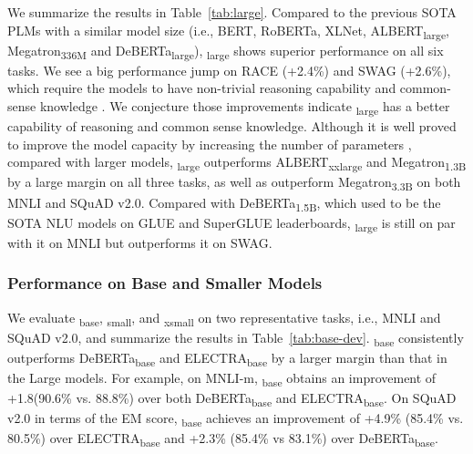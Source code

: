 We summarize the results in Table~{\ref{tab:large}}. 
Compared to the previous SOTA PLMs with a similar model size (i.e., BERT, RoBERTa, XLNet,  ALBERT\textsubscript{large}, Megatron\textsubscript{336M} and DeBERTa\textsubscript{large}),  {\ModelName}\textsubscript{large} shows superior performance on all six tasks. We see a big performance jump on RACE (+2.4\%) and SWAG (+2.6\%), which require the models to have non-trivial reasoning capability and common-sense knowledge \citep{lai2017race, zellers2018swag}. We conjecture those improvements indicate {\ModelName}\textsubscript{large} has a better capability of reasoning and common sense knowledge. Although it is well proved to improve the model capacity by increasing the number of parameters \citep{raffel2019t5,fedus2021switch}, compared with larger models, {\ModelName}\textsubscript{large} outperforms ALBERT\textsubscript{xxlarge} and Megatron\textsubscript{1.3B} by a large margin on all three tasks, as well as outperform Megatron\textsubscript{3.3B} on both MNLI and SQuAD v2.0. Compared with DeBERTa\textsubscript{1.5B}, which used to be the SOTA NLU models on GLUE and SuperGLUE leaderboards, {\ModelName}\textsubscript{large} is still on par with it on MNLI but outperforms it on SWAG. 

\subsubsection{Performance on Base and Smaller Models}

We evaluate {\ModelName}\textsubscript{base}, {\ModelName}\textsubscript{small}, and {\ModelName}\textsubscript{xsmall} on two representative tasks, i.e., MNLI and SQuAD v2.0, and summarize the results in Table~\ref{tab:base-dev}. 
{\ModelName}\textsubscript{base} consistently outperforms DeBERTa\textsubscript{base} and ELECTRA\textsubscript{base} by a larger margin than that in the Large models. For example, on MNLI-m, {\ModelName\textsubscript{base}} obtains an improvement of +1.8(90.6\% vs. 88.8\%) over both DeBERTa\textsubscript{base} and ELECTRA\textsubscript{base}. On SQuAD v2.0 in terms of the EM score,  {\ModelName\textsubscript{base}} achieves an improvement of +4.9\%  (85.4\% vs. 80.5\%) over ELECTRA\textsubscript{base} and +2.3\% (85.4\% vs 83.1\%) over DeBERTa\textsubscript{base}.

